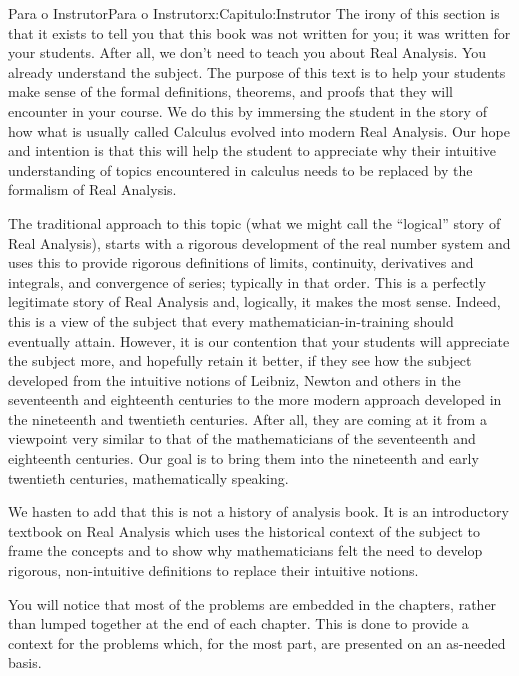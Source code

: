 \typeout{************************************************}
\typeout{************************************************}
%
\begin{chapterptx}{Para o Instrutor}{}{Para o Instrutor}{}{}{x:Capitulo:Instrutor}
	The irony of this section is that it exists to tell you that this book was not written for you; it was written for your students. After all, we don't need to teach you about Real Analysis. You already understand the subject. The purpose of this text is to help your students make sense of the formal definitions, theorems, and proofs that they will encounter in your course. We do this by immersing the student in the story of how what is usually called Calculus evolved into modern Real Analysis. Our hope and intention is that this will help the student to appreciate why their intuitive understanding of topics encountered in calculus needs to be replaced by the formalism of Real Analysis.%
	\par
	The traditional approach to this topic (what we might call the ``logical'' story of Real Analysis), starts with a rigorous development of the real number system and uses this to provide rigorous definitions of limits, continuity, derivatives and integrals, and convergence of series; typically in that order. This is a perfectly legitimate story of Real Analysis and, logically, it makes the most sense. Indeed, this is a view of the subject that every mathematician-in-training should eventually attain. However, it is our contention that your students will appreciate the subject more, and hopefully retain it better, if they see how the subject developed from the intuitive notions of Leibniz, Newton and others in the seventeenth and eighteenth centuries to the more modern approach developed in the nineteenth and twentieth centuries. After all, they are coming at it from a viewpoint very similar to that of the mathematicians of the seventeenth and eighteenth centuries. Our goal is to bring them into the nineteenth and early twentieth centuries, mathematically speaking.%
	\par
	We hasten to add that this is not a history of analysis book. It is an introductory textbook on Real Analysis which uses the historical context of the subject to frame the concepts and to show why mathematicians felt the need to develop rigorous, non-intuitive definitions to replace their intuitive notions.%
	\par
	You will notice that most of the problems are embedded in the chapters, rather than lumped together at the end of each chapter. This is done to provide a context for the problems which, for the most part, are presented on an as-needed basis.%

\end{chapterptx}
